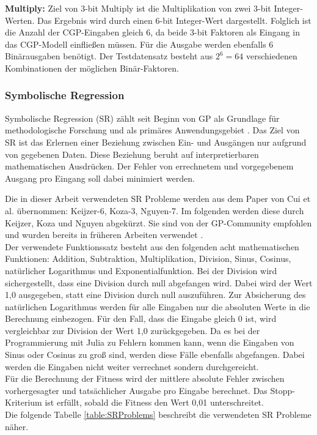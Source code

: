 \textbf{Multiply:} Ziel von 3-bit Multiply ist die Multiplikation von zwei 3-bit Integer-Werten.
Das Ergebnis wird durch einen 6-bit Integer-Wert dargestellt. \cite{cui_weighted_mutation}
Folglich ist die Anzahl der CGP-Eingaben gleich 6, da beide 3-bit Faktoren als Eingang in das CGP-Modell einfließen müssen.
Für die Ausgabe werden ebenfalls 6 Binärausgaben benötigt.
Der Testdatensatz besteht aus $2^6=64$ verschiedenen Kombinationen der möglichen Binär-Faktoren.

\subsubsection{Symbolische Regression}
\label{subsubsec:symbolicRegression}

Symbolische Regression (SR) zählt seit Beginn von GP als Grundlage für methodologische Forschung und als primäres Anwendungsgebiet \cite{orzechowski}.
Das Ziel von SR ist das Erlernen einer Beziehung zwischen Ein- und Ausgängen nur aufgrund von gegebenen Daten.
Diese Beziehung beruht auf interpretierbaren mathematischen Ausdrücken.
Der Fehler von errechnetem und vorgegebenem Ausgang pro Eingang soll dabei minimiert werden. \cite{makke_interpretable_2024}

Die in dieser Arbeit verwendeten SR Probleme werden aus dem Paper von Cui et al. übernommen: Keijzer-6, Koza-3, Nguyen-7.
Im folgenden werden diese durch Keijzer, Koza und Nguyen abgekürzt.
Sie sind von der GP-Community empfohlen und wurden bereits in früheren Arbeiten verwendet
\cite{white_better_2013, kalkreuth_comprehensive_2020}.\\
Der verwendete Funktionssatz besteht aus den folgenden acht mathematischen Funktionen: Addition, Subtraktion, Multiplikation, Division, Sinus, Cosinus, natürlicher Logarithmus und Exponentialfunktion.
Bei der Division wird sichergestellt, dass eine Division durch null abgefangen wird. \cite{affenzeller_positional_2024}
Dabei wird der Wert 1,0 ausgegeben, statt eine Division durch null auszuführen.
Zur Absicherung des natürlichen Logarithmus werden für alle Eingaben nur die absoluten Werte in die Berechnung einbezogen.
Für den Fall, dass die Eingabe gleich 0 ist, wird vergleichbar zur Division der Wert 1,0 zurückgegeben.
Da es bei der Programmierung mit Julia zu Fehlern kommen kann, wenn die Eingaben von Sinus oder Cosinus zu groß sind, werden diese Fälle ebenfalls abgefangen.
Dabei werden die Eingaben nicht weiter verrechnet sondern durchgereicht.\\
Für die Berechnung der Fitness wird der mittlere absolute Fehler zwischen vorhergesagter und tatsächlicher Ausgabe pro Eingabe berechnet.
Das Stopp-Kriterium ist erfüllt, sobald die Fitness den Wert 0,01 unterschreitet. \cite{affenzeller_positional_2024}\\
Die folgende Tabelle \ref{table:SRProblems} beschreibt die verwendeten SR Probleme näher.

